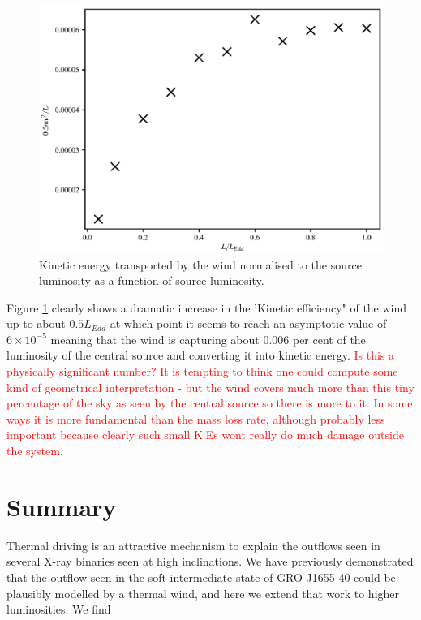 \documentclass[a4paper,fleqn,usenatbib]{mnras}
\begin{document}
\begin{figure}
\includegraphics[width=\columnwidth]{figures/lum_vs_ke.eps}
\caption{Kinetic energy transported by the wind normalised to the source
luminosity as a function of source luminosity.}
\label{figure:ke_vs_lum}
\end{figure}

Figure \ref{figure:ke_vs_lum} clearly shows a dramatic increase in the 'Kinetic
efficiency" of the wind up to about $0.5L_{Edd}$ at which point it seems to
reach an asymptotic value of $6\times10^{-5}$ meaning that the wind is 
capturing about 0.006 per cent of the luminosity of the central source and converting
it into kinetic energy.
\textcolor{red}{Is this a physically significant number? It is tempting to think one 
could compute some kind of geometrical interpretation - but the wind covers much
more than this tiny percentage of the sky as seen by the central source so there
is more to it. In some ways it is more fundamental than the mass loss rate, although
probably less important because clearly such small K.Es wont really do much damage
outside the system.}


\section{Summary }

Thermal driving is an attractive mechanism to explain the outflows seen in several 
X-ray binaries seen at high inclinations. We have previously demonstrated that 
the outflow seen in the soft-intermediate state of GRO J1655-40 could be plausibly 
modelled by a thermal wind, and here we extend that work to higher luminosities. We find
\end{document}
